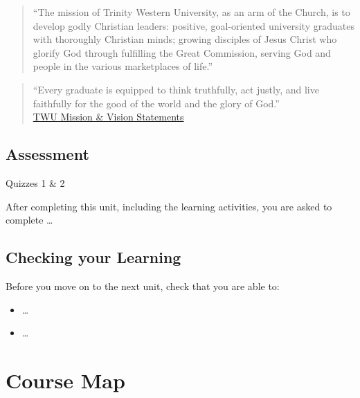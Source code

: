 \documentclass[
]{book}
\providecommand{\tightlist}{%
  \setlength{\itemsep}{0pt}\setlength{\parskip}{0pt}}
\theoremstyle{definition}
\theoremstyle{definition}
\theoremstyle{definition}
\theoremstyle{definition}
\theoremstyle{remark}
\begin{document}
\begin{quote}
``The mission of Trinity Western University, as an arm of the Church, is to develop godly Christian leaders: positive, goal-oriented university graduates with thoroughly Christian minds; growing disciples of Jesus Christ who glorify God through fulfilling the Great Commission, serving God and people in the various marketplaces of life.''
\end{quote}

\begin{quote}
``Every graduate is equipped to think truthfully, act justly, and live faithfully for the good of the world and the glory of God.''\\
\href{https://www.twu.ca/about-us/commitments/mission-vision}{TWU Mission \& Vision Statements}
\end{quote}

\hypertarget{assessment-4}{%
\section*{Assessment}\label{assessment-4}}

\begin{assessment}
{Quizzes 1 \& 2}

After completing this unit, including the learning activities, you are asked to complete \ldots{}
\end{assessment}

\hypertarget{checking-your-learning-5}{%
\section*{Checking your Learning}\label{checking-your-learning-5}}

\begin{progress}
Before you move on to the next unit, check that you are able to:

\begin{itemize}
\tightlist
\item
  \ldots{}
\item
  \ldots{}
\end{itemize}
\end{progress}

\hypertarget{course-map}{%
\chapter*{Course Map}\label{course-map}}
\end{document}
